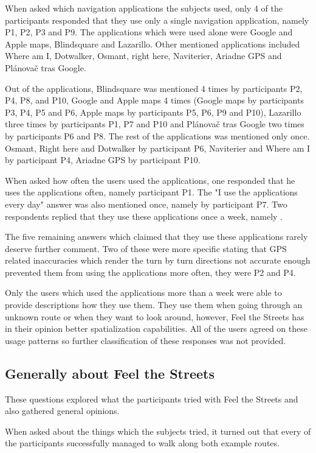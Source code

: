 \documentclass[nolof,digital]{fithesis3}
\begin{document}
When asked which navigation applications the subjects used, only 4 of the participants responded that they use only a single navigation application, namely P1, P2, P3 and P9. The applications which were used alone were Google and Apple maps, Blindsquare and Lazarillo. Other mentioned applications included Where am I, Dotwalker, Osmant, right here, Naviterier, Ariadne GPS and Plánovač tras Google.

Out of the applications, Blindsquare was mentioned 4 times by participants P2, P4, P8, and P10, Google and Apple maps 4 times (Google maps by participants P3, P4, P5 and P6, Apple maps by participants P5, P6, P9 and P10), Lazarillo three times by participants P1, P7 and P10 and Plánovač tras Google two times by participants P6 and P8. The rest of the applications was mentioned only once. Osmant, Right here and Dotwalker by participant P6, Naviterier and Where am I by participant P4, Ariadne GPS by participant P10.

When asked how often the users used the applications, one responded that he uses the applications often, namely participant P1. The "I use the applications every day" answer was also mentioned once, namely by participant P7. Two respondents replied that they use these applications once a week, namely .

The five remaining answers which claimed that they use these applications rarely deserve further comment. Two of these were more specific stating that GPS related inaccuracies which render the turn by turn directions not accurate enough prevented them from using the applications more often, they were P2 and P4.

Only the users which used the applications more than a week were able to provide descriptions how they use them. They use them when going through an unknown route or when they want to look around, however, Feel the Streets has in their opinion better spatialization capabilities. All of the users agreed on these usage patterns so further classification of these responses was not provided.
\subsection{Generally about Feel the Streets}
These questions explored what the participants tried with Feel the Streets and also gathered general opinions.

When asked about the things which the subjects tried, it turned out that every of the participants successfully managed to walk along both example routes.
\end{document}
